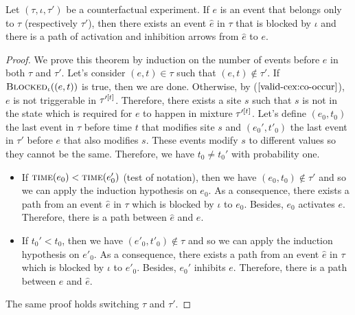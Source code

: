 \begin{theorem*} Let $(\tau, \iota, \tau')$ be a counterfactual
  experiment. If $e$ is an event that belongs only to $\tau$
  (respectively $\tau'$), then there exists an event $\hat e$ in
  $\tau$ that is blocked by $\iota$ and there is a path of activation
  and inhibition arrows from $\hat e$ to $e$.
\end{theorem*}
\begin{proof}
  We prove this theorem by induction on the number of events before
  $e$ in both $\tau$ and $\tau'$. Let's consider $(e, t) \in \tau$
  such that $(e, t) \notin \tau'$. If $\BLOCKED{\iota}{(e, t)}$ is
  true, then we are done. Otherwise, by ($\ref{valid-cex:co-occur}$),
  $e$ is not triggerable in $\TSTATE{t}{\tau'}$. Therefore, there
  exists a site $s$ such that $s$ is not in the state which is
  required for $e$ to happen in mixture $\TSTATE{t}{\tau'}$. Let's
  define $(e_0, t_0)$ the last event in $\tau$ before time $t$ that
  modifies site $s$ and $(e_0', t'_0)$ the last event in $\tau'$
  before $e$ that also modifies $s$. These events modify $s$ to
  different values so they cannot be the same. Therefore, we have
  $t_0 \neq t_0'$ with probability one.

  \begin{itemize}
  \item If $\TIME{e_0} < \TIME{e_0'}$ (test of notation), then we have
    $(e_0, t_0) \notin \tau'$ and so we can apply the induction
    hypothesis on $e_0$. As a consequence, there exists a path from an
    event $\hat e$ in $\tau$ which is blocked by $\iota$ to
    $e_0$. Besides, $e_0$ activates $e$. Therefore, there is a path
    between $\hat e$ and $e$.
  \item If $t_0' < t_0$, then we have $(e'_0, t'_0) \notin \tau$ and
    so we can apply the induction hypothesis on $e'_0$. As a
    consequence, there exists a path from an event $\hat e$ in $\tau$
    which is blocked by $\iota$ to $e'_0$. Besides, $e_0'$ inhibits
    $e$.  Therefore, there is a path between $e$ and $\hat e$.
  \end{itemize}
  The same proof holds switching $\tau$ and $\tau'$.

\end{proof}
